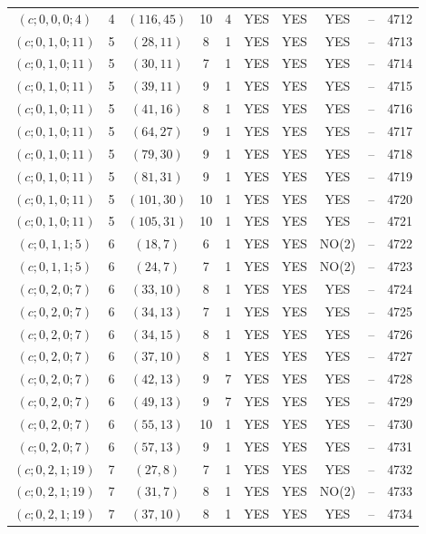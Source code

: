 \begin{longtable}{|c|c|c|c|c|c|c|c|c|c|}
$(c; 0, 0, 0; 4)$ & 4 & $(116, 45)$ & 10 & 4 & YES & YES & YES & -- & 4712\\
$(c; 0, 1, 0; 11)$ & 5 & $(28, 11)$ & 8 & 1 & YES & YES & YES & -- & 4713\\
$(c; 0, 1, 0; 11)$ & 5 & $(30, 11)$ & 7 & 1 & YES & YES & YES & -- & 4714\\
$(c; 0, 1, 0; 11)$ & 5 & $(39, 11)$ & 9 & 1 & YES & YES & YES & -- & 4715\\
$(c; 0, 1, 0; 11)$ & 5 & $(41, 16)$ & 8 & 1 & YES & YES & YES & -- & 4716\\
$(c; 0, 1, 0; 11)$ & 5 & $(64, 27)$ & 9 & 1 & YES & YES & YES & -- & 4717\\
$(c; 0, 1, 0; 11)$ & 5 & $(79, 30)$ & 9 & 1 & YES & YES & YES & -- & 4718\\
$(c; 0, 1, 0; 11)$ & 5 & $(81, 31)$ & 9 & 1 & YES & YES & YES & -- & 4719\\
$(c; 0, 1, 0; 11)$ & 5 & $(101, 30)$ & 10 & 1 & YES & YES & YES & -- & 4720\\
$(c; 0, 1, 0; 11)$ & 5 & $(105, 31)$ & 10 & 1 & YES & YES & YES & -- & 4721\\
$(c; 0, 1, 1; 5)$ & 6 & $(18, 7)$ & 6 & 1 & YES & YES & NO(2) & -- & 4722\\
$(c; 0, 1, 1; 5)$ & 6 & $(24, 7)$ & 7 & 1 & YES & YES & NO(2) & -- & 4723\\
$(c; 0, 2, 0; 7)$ & 6 & $(33, 10)$ & 8 & 1 & YES & YES & YES & -- & 4724\\
$(c; 0, 2, 0; 7)$ & 6 & $(34, 13)$ & 7 & 1 & YES & YES & YES & -- & 4725\\
$(c; 0, 2, 0; 7)$ & 6 & $(34, 15)$ & 8 & 1 & YES & YES & YES & -- & 4726\\
$(c; 0, 2, 0; 7)$ & 6 & $(37, 10)$ & 8 & 1 & YES & YES & YES & -- & 4727\\
$(c; 0, 2, 0; 7)$ & 6 & $(42, 13)$ & 9 & 7 & YES & YES & YES & -- & 4728\\
$(c; 0, 2, 0; 7)$ & 6 & $(49, 13)$ & 9 & 7 & YES & YES & YES & -- & 4729\\
$(c; 0, 2, 0; 7)$ & 6 & $(55, 13)$ & 10 & 1 & YES & YES & YES & -- & 4730\\
$(c; 0, 2, 0; 7)$ & 6 & $(57, 13)$ & 9 & 1 & YES & YES & YES & -- & 4731\\
$(c; 0, 2, 1; 19)$ & 7 & $(27, 8)$ & 7 & 1 & YES & YES & YES & -- & 4732\\
$(c; 0, 2, 1; 19)$ & 7 & $(31, 7)$ & 8 & 1 & YES & YES & NO(2) & -- & 4733\\
$(c; 0, 2, 1; 19)$ & 7 & $(37, 10)$ & 8 & 1 & YES & YES & YES & -- & 4734\\

\end{longtable}

